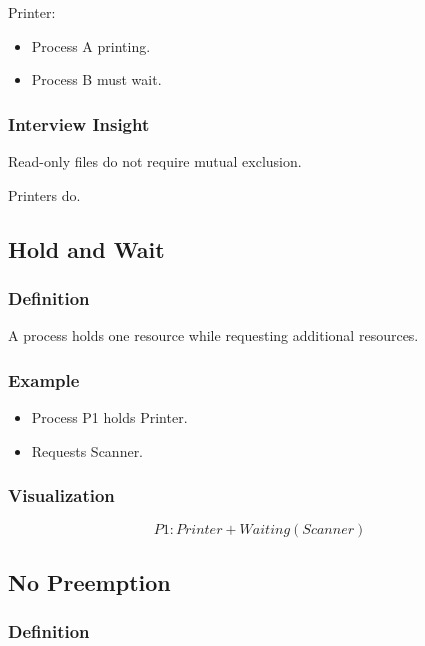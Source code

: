 Printer:

\begin{itemize}
\item Process A printing.
\item Process B must wait.
\end{itemize}

\subsubsection{Interview Insight}

Read-only files do not require mutual exclusion.

Printers do.

\subsection{Hold and Wait}

\subsubsection{Definition}

A process holds one resource while requesting additional resources.

\subsubsection{Example}

\begin{itemize}
\item Process P1 holds Printer.
\item Requests Scanner.
\end{itemize}

\subsubsection{Visualization}

\[
P1 : Printer + Waiting(Scanner)
\]

\subsection{No Preemption}

\subsubsection{Definition}

